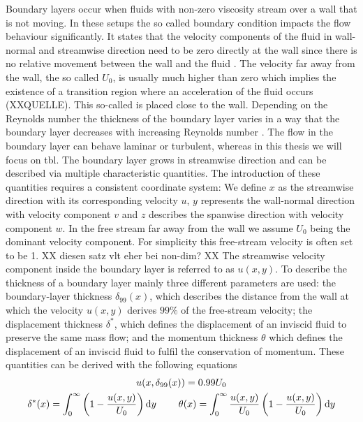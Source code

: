 Boundary layers occur when fluids with non-zero viscosity stream over a wall that is not moving. 
In these setups the so called  boundary condition impacts the flow behaviour significantly.
It states that the velocity components of the fluid in wall-normal and streamwise direction need to be zero directly at the wall since there is no relative movement between the wall and the fluid \citep{schlichting_boundary-layer_2017}. 
The velocity far away from the wall, the so called  $U_0$, is usually much higher than zero which implies the existence of a transition region where an acceleration of the fluid occurs (XXQUELLE).
This so-called  is placed close to the wall. 
Depending on the Reynolds number the thickness of the boundary layer varies in a way that the boundary layer decreases with increasing Reynolds number \cite{schlichting_boundary-layer_2017}. 
The flow in the boundary layer can behave laminar or turbulent, whereas in this thesis we will focus on \acrfull{tbl}.
The boundary layer grows in streamwise direction and can be described via multiple characteristic quantities. 
The introduction of these quantities requires a consistent coordinate system: 
We define $x$ as the streamwise direction with its corresponding velocity $u$, $y$ represents the wall-normal direction with velocity component $v$ and $z$ describes the spanwise direction with velocity component $w$.
In the free stream far away from the wall we assume $U_0$ being the dominant velocity component. 
For simplicity this free-stream velocity is often set to be 1. XX diesen satz vlt eher bei non-dim? XX
The streamwise velocity component inside the boundary layer is referred to as $u(x,y)$.
To describe the thickness of a boundary layer mainly three different parameters are used: 
the boundary-layer thickness $\delta_{99}(x)$, which describes the distance from the wall at which the velocity $u(x,y)$ derives $99\%$ of the free-stream velocity;
the displacement thickness $\delta^*$, which defines the displacement of an inviscid fluid to preserve the same mass flow;
and the momentum thickness $\theta$  which defines the displacement of an inviscid fluid to fulfil the conservation of momentum.
These quantities can be derived with the following equations
\begin{gather}\label{eq: tblThickness}
    u (x, \delta_{99}(x)) = 0.99 U_0 \\
    \delta^*(x) = \int_0^\infty \left( 1 - \frac{u(x,y)}{U_0} \right) \mathrm{d}y \hspace{0.8cm}
     \theta(x) = \int_0^\infty \frac{u(x,y)}{U_0} \left( 1 - \frac{u(x,y)}{U_0} \right) \mathrm{d}y
\end{gather}


